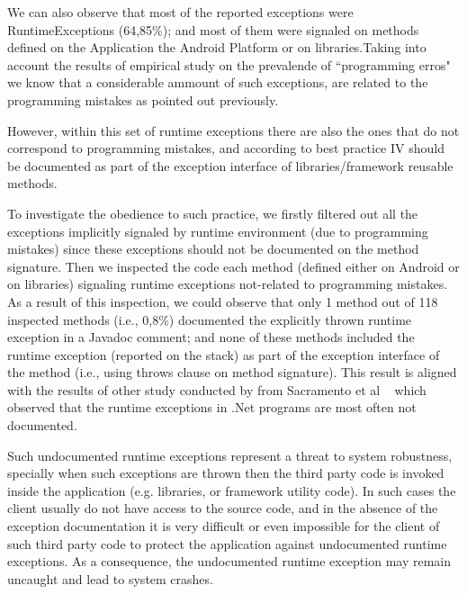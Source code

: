 \documentclass[conference]{IEEEtran}
\begin{document}
We can also observe that most of the reported exceptions were RuntimeExceptions
(64,85\%); and most of them were signaled on methods defined on the Application 
the Android Platform or on libraries.Taking into account the results of empirical study on 
the prevalende of ``programming erros" we know that a considerable ammount 
of such exceptions, are related to the programming mistakes
as pointed out previously.

However, within this set of runtime exceptions there are also the ones that do not correspond to programming mistakes,
and according to best practice IV should be documented as part of the exception interface of libraries/framework reusable
methods.

To investigate the obedience to such practice, we firstly filtered out all the exceptions implicitly
 signaled by  runtime environment (due to programming mistakes) since these exceptions 
should not be documented on the method signature. Then we inspected the code each method 
(defined either on Android or on libraries) signaling  runtime exceptions not-related to programming mistakes.
As a result of this inspection, we could observe that only 1 method out of 118 inspected methods
 (i.e., 0,8\%) documented the explicitly thrown runtime exception in a Javadoc comment; and none of these methods
included the runtime exception  (reported on the stack) as part of the exception interface of the method (i.e., using 
throws clause on method signature). This result is aligned with the results of other study conducted by from 
Sacramento et al ~\cite{sacramento2006unchecked} which observed that the
runtime exceptions in .Net programs are most often not documented.

Such undocumented runtime exceptions represent a threat to system robustness, specially
when such exceptions are thrown then the third party code is invoked inside the application 
(e.g. libraries, or framework utility code). In such cases the client usually do not have access to 
the source code, and in the absence of
the exception documentation it is very difficult or even impossible for the client of such third party code to 
protect the application against undocumented runtime exceptions. As a consequence, the
 undocumented runtime exception may remain uncaught and lead to system crashes.



\noindent {}
\end{document}
